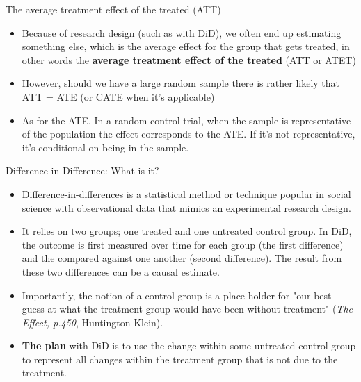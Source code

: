 \documentclass[notes,11pt, aspectratio=169]{beamer}
\begin{document}
\begin{frame}{The average treatment effect of the treated (ATT)}
\begin{itemize}
      \item Because of research design (such as with DiD), we often end up estimating something else, which is the average effect for the group that gets treated, in other words the \textbf{average treatment effect of the treated} (ATT or ATET)

      \item However, should we have a large random sample there is rather likely that ATT = ATE (or CATE when it's applicable)

      \item As for the ATE. In a random control trial, when the sample is representative of the population the  effect corresponds to the ATE. If it's not representative, it's conditional on being in the sample.
\end{itemize}
\end{frame}

\begin{frame}{Difference-in-Difference: What is it?}
\begin{itemize}
        \item Difference-in-differences is a statistical method or technique popular in social science with observational data that mimics an experimental research design. 

        \item It relies on two groups; one treated and one untreated control group. In DiD, the outcome is first measured over time for each group (the first difference) and the compared against one another (second difference). The result from these two differences can be a causal estimate. 

        \item Importantly, the notion of a control group is a place holder for "our best guess at what the treatment group would have been without treatment" \tiny{ (\emph{The Effect, p.450}, Huntington-Klein)}.
        
        \item \textbf{The plan} with DiD is to use the change within some untreated control group to represent all changes within the treatment group that is not due to the treatment.
\end{itemize}
\normalsize
\end{frame}
\end{document}

